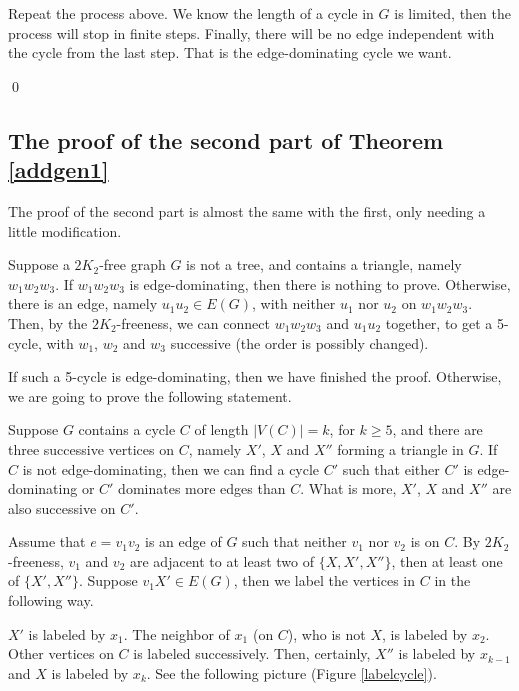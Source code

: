 \documentclass{amsart}
\theoremstyle{definition}
\begin{document}
Repeat the process above. We know the length of a cycle in $G$ is limited, then the process will stop in finite steps. Finally, there will be no edge independent with the cycle from the last step. That is the edge-dominating cycle we want.

\qed

\subsection{The proof of the second part of Theorem  \ref{addgen1}}
The proof of the second part is almost the same with the first, only needing a little modification.

Suppose a $2K_2$-free graph $G$ is not a tree, and contains a triangle, namely $w_1w_2w_3$.
If $w_1w_2w_3$ is edge-dominating, then there is nothing to prove. Otherwise, there is an edge, namely $u_1u_2\in E(G)$, with neither $u_1$ nor $u_2$  on $w_1w_2w_3$. Then, by the $2K_2$-freeness, we can connect $w_1w_2w_3$ and $u_1u_2$ together, to get a 5-cycle, with $w_1$, $w_2$ and $w_3$ successive (the order is possibly changed). 

If such a 5-cycle is edge-dominating, then we have finished the proof. Otherwise, we are going to prove the following statement. 

Suppose $G$ contains a cycle $C$ of length $|V(C)|=k$, for $k\ge5$, and there are three successive vertices on $C$, namely $X'$, $X$ and $X''$ forming a triangle in $G$. If $C$ is not edge-dominating, then we can find a cycle $C'$ such that either $C'$ is edge-dominating or $C'$ dominates more edges than $C$. What is more, $X'$, $X$ and $X''$ are also successive on $C'$.

Assume that $e=v_1v_2$ is an edge of $G$ such that neither $v_1$ nor $v_2$ is on $C$. By $2K_2$-freeness, $v_1$ and $v_2$ are adjacent to at least two of $\{X,X',X''\}$, then at least one of $\{X',X''\}$. Suppose $v_1X'\in E(G)$, then we label the vertices in $C$ in the following way.

$X'$ is labeled by $x_1$. The neighbor of $x_1$ (on $C$), who is not $X$, is labeled by $x_2$. Other vertices on $C$ is labeled successively. Then, certainly, $X''$ is labeled by $x_{k-1}$ and $X$ is labeled by $x_k$. See the following picture (Figure \ref{labelcycle}).
\end{document}
